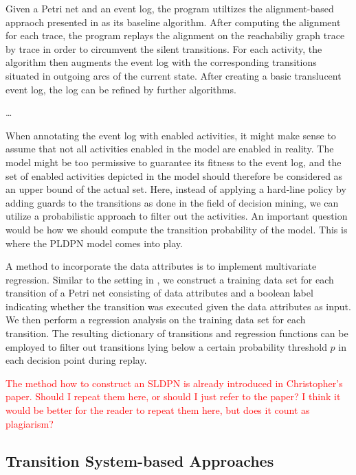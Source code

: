 Given a Petri net and an event log, the program utiltizes the alignment-based appraoch presented in \cite{creating-translucent-event-logs} as its baseline algorithm. After computing the alignment for each trace, the program replays the alignment on the reachabiliy graph trace by trace in order to circumvent the silent transitions. For each activity, the algorithm then augments the event log with the corresponding transitions situated in outgoing arcs of the current state. After creating a basic translucent event log, the log can be refined by further algorithms.

\dots

When annotating the event log with enabled activities, it might make sense to assume that not all activities enabled in the model are enabled in reality. The model might be too permissive to guarantee its fitness to the event log, and the set of enabled activities depicted in the model should therefore be considered as an upper bound of the actual set. Here, instead of applying a hard-line policy by adding guards to the transitions as done in the field of decision mining, we can utilize a probabilistic approach to filter out the activities. An important question would be how we should compute the transition probability of the model. This is where the PLDPN model comes into play.

A method to incorporate the data attributes is to implement multivariate regression. Similar to the setting in \cite{sldpn}, we construct a training data set for each transition of a Petri net consisting of data attributes and a boolean label indicating whether the transition was executed given the data attributes as input. We then perform a regression analysis on the training data set for each transition. The resulting dictionary of transitions and regression functions can be employed to filter out transitions lying below a certain probability threshold $p$ in each decision point during replay.

\textcolor{red}{The method how to construct an SLDPN is already introduced in Christopher's paper. Should I repeat them here, or should I just refer to the paper? I think it would be better for the reader to repeat them here, but does it count as plagiarism?}



\subsection{Transition System-based Approaches}

